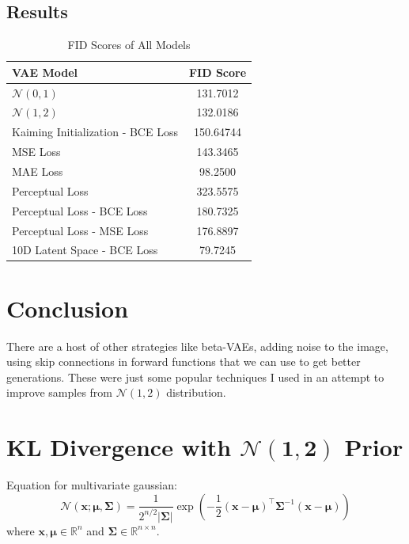 \documentclass[12pt]{article}
\begin{document}
\subsection{Results}
\begin{table}[ht]
\centering
\begin{tabular}{@{}lc@{}}
\toprule
VAE Model & FID Score \\ \midrule
\(\mathcal{N}(0,1)\) & 131.7012 \\
\(\mathcal{N}(1,2)\) & 132.0186 \\ 
Kaiming Initialization - BCE Loss & 150.64744\\
MSE Loss & 143.3465 \\ 
MAE Loss & 98.2500 \\
Perceptual Loss & 323.5575\\
Perceptual Loss - BCE Loss & 180.7325 \\
Perceptual Loss - MSE Loss & 176.8897\\ 
10D Latent Space - BCE Loss & 79.7245\\ \bottomrule
\end{tabular}
\caption{\label{tab:FID Baseline}FID Scores of All Models}
\end{table}

\section{Conclusion}
There are a host of other strategies like beta-VAEs, adding noise to the image, using skip connections in forward functions that we can use to get better generations. These were just some popular techniques I used in an attempt to improve samples from \(\mathcal{N}(1,2)\) distribution.

\section{KL Divergence with $\boldsymbol{\mathcal{N}(1,2)}$ Prior}
\label{derivation}
Equation for multivariate gaussian:
\begin{equation}
\mathcal{N}(\mathbf{x};\boldsymbol{\mu},\boldsymbol{\Sigma})=
\frac{1}{2^{n/2} |\boldsymbol{\Sigma}|}\exp \left(
-\frac{1}{2} (\mathbf{x}-\boldsymbol{\mu})^{\intercal}  \boldsymbol{\Sigma}^{-1}(\mathbf{x}-\boldsymbol{\mu})
\right)
\end{equation}
where $\mathbf{x},\boldsymbol{\mu}\in\mathbb{R}^n$ and $\boldsymbol{\Sigma}\in\mathbb{R}^{n\times n}$. 
\end{document}
